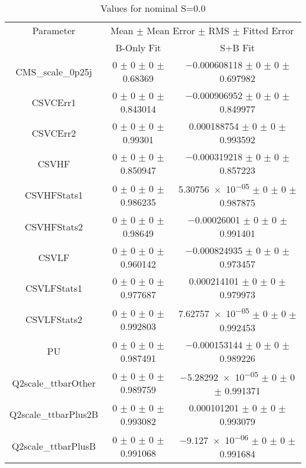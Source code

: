 \begin{table}
\centering
\caption{Values for nominal S=0.0}
\begin{tabular}{ccc}
\toprule
Parameter & \multicolumn{2}{c}{Mean $\pm$ Mean Error $\pm$ RMS $\pm$ Fitted Error}\\
 & B-Only Fit & S+B Fit\\
\midrule
CMS\_scale\_0p25j & \num{0} $\pm$ \num{0} $\pm$ \num{0} $\pm$ \num{0.68369} & \num{-0.000608118} $\pm$ \num{0} $\pm$ \num{0} $\pm$ \num{0.697982}\\
CSVCErr1 & \num{0} $\pm$ \num{0} $\pm$ \num{0} $\pm$ \num{0.843014} & \num{-0.000906952} $\pm$ \num{0} $\pm$ \num{0} $\pm$ \num{0.849977}\\
CSVCErr2 & \num{0} $\pm$ \num{0} $\pm$ \num{0} $\pm$ \num{0.99301} & \num{0.000188754} $\pm$ \num{0} $\pm$ \num{0} $\pm$ \num{0.993592}\\
CSVHF & \num{0} $\pm$ \num{0} $\pm$ \num{0} $\pm$ \num{0.850947} & \num{-0.000319218} $\pm$ \num{0} $\pm$ \num{0} $\pm$ \num{0.857223}\\
CSVHFStats1 & \num{0} $\pm$ \num{0} $\pm$ \num{0} $\pm$ \num{0.986235} & \num{5.30756e-05} $\pm$ \num{0} $\pm$ \num{0} $\pm$ \num{0.987875}\\
CSVHFStats2 & \num{0} $\pm$ \num{0} $\pm$ \num{0} $\pm$ \num{0.98649} & \num{-0.00026001} $\pm$ \num{0} $\pm$ \num{0} $\pm$ \num{0.991401}\\
CSVLF & \num{0} $\pm$ \num{0} $\pm$ \num{0} $\pm$ \num{0.960142} & \num{-0.000824935} $\pm$ \num{0} $\pm$ \num{0} $\pm$ \num{0.973457}\\
CSVLFStats1 & \num{0} $\pm$ \num{0} $\pm$ \num{0} $\pm$ \num{0.977687} & \num{0.000214101} $\pm$ \num{0} $\pm$ \num{0} $\pm$ \num{0.979973}\\
CSVLFStats2 & \num{0} $\pm$ \num{0} $\pm$ \num{0} $\pm$ \num{0.992803} & \num{7.62757e-05} $\pm$ \num{0} $\pm$ \num{0} $\pm$ \num{0.992453}\\
PU & \num{0} $\pm$ \num{0} $\pm$ \num{0} $\pm$ \num{0.987491} & \num{-0.000153144} $\pm$ \num{0} $\pm$ \num{0} $\pm$ \num{0.989226}\\
Q2scale\_ttbarOther & \num{0} $\pm$ \num{0} $\pm$ \num{0} $\pm$ \num{0.989759} & \num{-5.28292e-05} $\pm$ \num{0} $\pm$ \num{0} $\pm$ \num{0.991371}\\
Q2scale\_ttbarPlus2B & \num{0} $\pm$ \num{0} $\pm$ \num{0} $\pm$ \num{0.993082} & \num{0.000101201} $\pm$ \num{0} $\pm$ \num{0} $\pm$ \num{0.993079}\\
Q2scale\_ttbarPlusB & \num{0} $\pm$ \num{0} $\pm$ \num{0} $\pm$ \num{0.991068} & \num{-9.127e-06} $\pm$ \num{0} $\pm$ \num{0} $\pm$ \num{0.991684}\\

\end{tabular}
\end{table}
